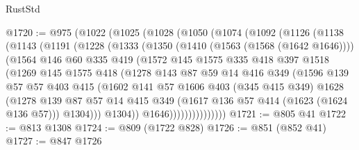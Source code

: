 \begin{lexlean}{RustStd}
\begin{coremodule}
@1720 := @975
    (@1022
      (@1025
        (@1028
          (@1050
            (@1074
              (@1092
                (@1126
                  (@1138
                    (@1143
                      (@1191
                        (@1228
                          (@1333
                            (@1350
                              (@1410 (@1563 (@1568 (@1642 @1646))))
                              (@1564
                                @146
                                @60
                                @335
                                @419
                                (@1572
                                  @145
                                  @1575
                                  @335
                                  @418
                                  @397
                                  @1518
                                  (@1269
                                    @145
                                    @1575
                                    @418
                                    (@1278
                                      @143
                                      @87
                                      @59
                                      @14
                                      @416
                                      @349
                                      (@1596
                                        @139
                                        @57
                                        @57
                                        @403
                                        @415
                                        (@1602
                                          @141
                                          @57
                                          @1606
                                          @403
                                          (@345 @415 @349)
                                          @1628
                                          (@1278
                                            @139
                                            @87
                                            @57
                                            @14
                                            @415
                                            @349
                                            (@1617 @136 @57 @414 (@1623 (@1624 @136 @57)))
                                            @1304)))
                                      @1304))
                                  @1646)))))))))))))))
@1721 := @805 @41
@1722 := @813 @1308
@1724 := @809 (@1722 @828)
@1726 := @851 (@852 @41)
@1727 := @847 @1726

\end{coremodule}
\end{lexlean}
